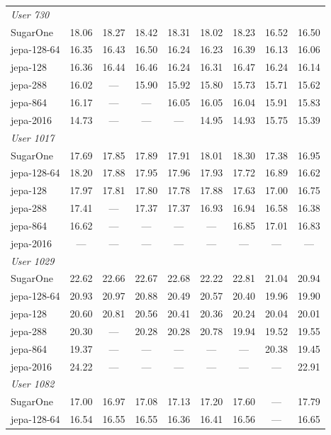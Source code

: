 \documentclass[11pt,a4paper]{article}
\begin{document}
\begin{table}[h]
\begin{tabular}{lcccccccc}
\multicolumn{9}{l}{\textit{User 730}} \\
SugarOne & 18.06 & 18.27 & 18.42 & 18.31 & 18.02 & 18.23 & 16.52 & 16.50 \\
jepa-128-64 & 16.35 & 16.43 & 16.50 & 16.24 & 16.23 & 16.39 & 16.13 & 16.06 \\
jepa-128 & 16.36 & 16.44 & 16.46 & 16.24 & 16.31 & 16.47 & 16.24 & 16.14 \\
jepa-288 & 16.02 & --- & 15.90 & 15.92 & 15.80 & 15.73 & 15.71 & 15.62 \\
jepa-864 & 16.17 & --- & --- & 16.05 & 16.05 & 16.04 & 15.91 & 15.83 \\
jepa-2016 & 14.73 & --- & --- & --- & 14.95 & 14.93 & 15.75 & 15.39 \\
\midrule
\multicolumn{9}{l}{\textit{User 1017}} \\
SugarOne & 17.69 & 17.85 & 17.89 & 17.91 & 18.01 & 18.30 & 17.38 & 16.95 \\
jepa-128-64 & 18.20 & 17.88 & 17.95 & 17.96 & 17.93 & 17.72 & 16.89 & 16.62 \\
jepa-128 & 17.97 & 17.81 & 17.80 & 17.78 & 17.88 & 17.63 & 17.00 & 16.75 \\
jepa-288 & 17.41 & --- & 17.37 & 17.37 & 16.93 & 16.94 & 16.58 & 16.38 \\
jepa-864 & 16.62 & --- & --- & --- & --- & 16.85 & 17.01 & 16.83 \\
jepa-2016 & --- & --- & --- & --- & --- & --- & --- & --- \\
\midrule
\multicolumn{9}{l}{\textit{User 1029}} \\
SugarOne & 22.62 & 22.66 & 22.67 & 22.68 & 22.22 & 22.81 & 21.04 & 20.94 \\
jepa-128-64 & 20.93 & 20.97 & 20.88 & 20.49 & 20.57 & 20.40 & 19.96 & 19.90 \\
jepa-128 & 20.60 & 20.81 & 20.56 & 20.41 & 20.36 & 20.24 & 20.04 & 20.01 \\
jepa-288 & 20.30 & --- & 20.28 & 20.28 & 20.78 & 19.94 & 19.52 & 19.55 \\
jepa-864 & 19.37 & --- & --- & --- & --- & --- & 20.38 & 19.45 \\
jepa-2016 & 24.22 & --- & --- & --- & --- & --- & --- & 22.91 \\
\midrule
\multicolumn{9}{l}{\textit{User 1082}} \\
SugarOne & 17.00 & 16.97 & 17.08 & 17.13 & 17.20 & 17.60 & --- & 17.79 \\
jepa-128-64 & 16.54 & 16.55 & 16.55 & 16.36 & 16.41 & 16.56 & --- & 16.65 \\

\end{tabular}
\end{table}
\end{document}
